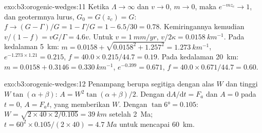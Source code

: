 \begin{solution}{exo:b3:orogenic-wedges:11}
Ketika $\Lambda \to \infty$ dan $v \to 0$, $m \to 0$, maka $e^{-mz_c} \to 1$, dan
geotermnya lurus, $G_0 = G(z_c) = G$: $f \to (G - \Gamma)/G = 1 -
\Gamma/G = 1 - 6.5/30 = 0.78$. Kemiringannya kemudian $v/(1 - f) = vG/\Gamma =
4.6v$. Untuk $v = \qty{1}{mm/yr}$, $v/2\kappa = \qty{0.0158}{km^{-1}}$. Pada kedalaman
\qty{5}{km}: $m = 0.0158 + \sqrt{0.0158^2 + 1.257^2} = \qty{1.273}{km^{-1}}$,
$e^{-1.273\times1.21} = 0.215$, $f = 40.0\times0.215/44.7 = 0.19$. Pada kedalaman
\qty{20}{km}: $m = 0.0158 + 0.3146 = \qty{0.330}{km^{-1}}$, $e^{-0.399} =
0.671$, $f = 40.0\times0.671/44.7 = 0.60$.
\end{solution}

\begin{solution}{exo:b3:orogenic-wedges:12}
Penampang berupa segitiga dengan alas $W$ dan tinggi $W\tan(\alpha + \beta)$:
$A = W^2\tan(\alpha + \beta)/2$. Dengan $\mathrm dA/\mathrm dt = F_a$ dan $A =
0$ pada $t = 0$, $A = F_at$, yang memberikan $W$. Dengan $\tan\ang{6} = 0.105$:
$W = \sqrt{2\times40\times2/0.105} = \qty{39}{km}$ setelah \qty{2}{Ma}; $t =
60^2\times0.105/(2\times40) = \qty{4.7}{Ma}$ untuk mencapai \qty{60}{km}.
\end{solution}

